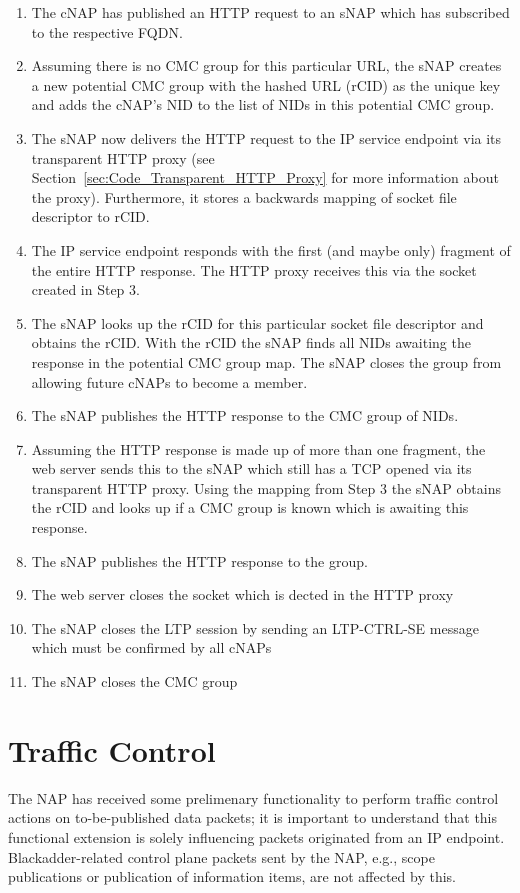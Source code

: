 \documentclass[a4paper,11pt,titlepage]{report}
\begin{document}
\begin{enumerate}
	\item The \ac{cNAP} has published an HTTP request to an \ac{sNAP} which has subscribed to the respective \ac{FQDN}.
	\item Assuming there is no \ac{CMC} group for this particular \ac{URL}, the \ac{sNAP} creates a new potential \ac{CMC} group with the hashed \ac{URL} (\ac{rCID}) as the unique key and adds the \ac{cNAP}'s \ac{NID} to the list of \acp{NID} in this potential \ac{CMC} group.
	\item The \ac{sNAP} now delivers the HTTP request to the IP service endpoint via its transparent HTTP proxy (see Section~\ref{sec:Code_Transparent_HTTP_Proxy} for more information about the proxy). Furthermore, it stores a backwards mapping of socket file descriptor to \ac{rCID}.
	\item The IP service endpoint responds with the first (and maybe only) fragment of the entire HTTP response. The HTTP proxy receives this via the socket created in Step 3. 
	\item The \ac{sNAP} looks up the \ac{rCID} for this particular socket file descriptor and obtains the \ac{rCID}. With the \ac{rCID} the \ac{sNAP} finds all \acp{NID} awaiting the response in the potential \ac{CMC} group map. The \ac{sNAP} closes the group from allowing future \acp{cNAP} to become a member.
	\item The \ac{sNAP} publishes the HTTP response to the \ac{CMC} group of \acp{NID}.
	\item Assuming the HTTP response is made up of more than one fragment, the web server sends this to the \ac{sNAP} which still has a TCP opened via its transparent HTTP proxy. Using the mapping from Step 3 the \ac{sNAP} obtains the \ac{rCID} and looks up if a \ac{CMC} group is known which is awaiting this response.
	\item The \ac{sNAP} publishes the HTTP response to the group.
	\item The web server closes the socket which is dected in the HTTP proxy
	\item The \ac{sNAP} closes the \ac{LTP} session by sending an \ac{LTP}-CTRL-\ac{SE} message which must be confirmed by all \acp{cNAP}
	\item The \ac{sNAP} closes the \ac{CMC} group
\end{enumerate}
\section{Traffic Control}
The \ac{NAP} has received some prelimenary functionality to perform traffic control actions on to-be-published data packets; it is important to understand that this functional extension is solely influencing packets originated from an IP endpoint. Blackadder-related control plane packets sent by the NAP, e.g., scope publications or publication of information items, are not affected by this.
\end{document}
